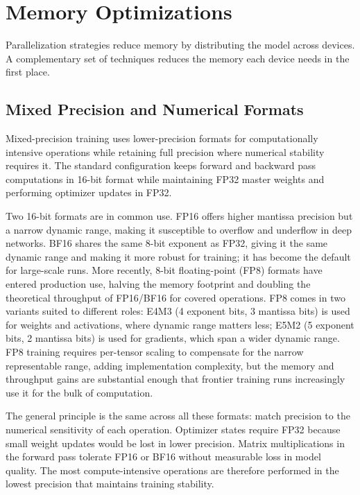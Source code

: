 \documentclass{book}
\begin{document}
\section{Memory Optimizations}
\label{sec:memory_optimizations}

Parallelization strategies reduce memory by distributing the model across
devices. A complementary set of techniques reduces the memory each device
needs in the first place.

\subsection{Mixed Precision and Numerical Formats}
\label{sec:mixed_precision}

Mixed-precision training uses lower-precision formats for computationally
intensive operations while retaining full precision where numerical stability
requires it. The standard configuration keeps forward and backward pass
computations in 16-bit format while maintaining FP32 master weights and
performing optimizer updates in FP32.

Two 16-bit formats are in common use. FP16 offers higher mantissa precision
but a narrow dynamic range, making it susceptible to overflow and underflow
in deep networks. BF16 shares the same 8-bit exponent as FP32, giving it
the same dynamic range and making it more robust for training; it has become
the default for large-scale runs. More recently, 8-bit floating-point (FP8)
formats have entered production use, halving the memory footprint and
doubling the theoretical throughput of FP16/BF16 for covered operations.
FP8 comes in two variants suited to different roles: E4M3 (4 exponent bits,
3 mantissa bits) is used for weights and activations, where dynamic range
matters less; E5M2 (5 exponent bits, 2 mantissa bits) is used for gradients,
which span a wider dynamic range. FP8 training requires per-tensor scaling to
compensate for the narrow representable range, adding implementation
complexity, but the memory and throughput gains are substantial enough that
frontier training runs increasingly use it for the bulk of computation.

The general principle is the same across all these formats: match precision
to the numerical sensitivity of each operation. Optimizer states require
FP32 because small weight updates would be lost in lower precision. Matrix
multiplications in the forward pass tolerate FP16 or BF16 without
measurable loss in model quality. The most compute-intensive operations are
therefore performed in the lowest precision that maintains training stability.
\end{document}
